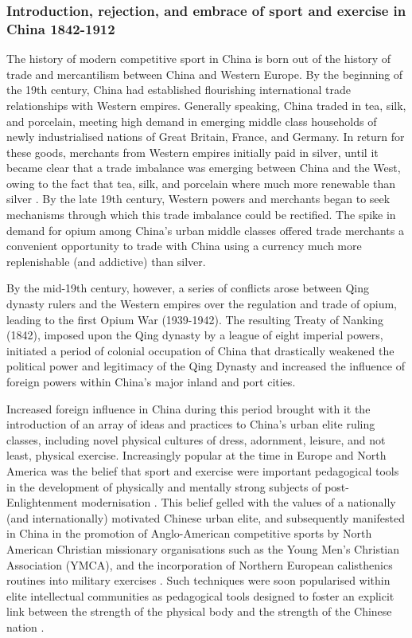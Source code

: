 \begin{CJK}{UTF8}{gbsn}
  \subsubsection{Introduction, rejection, and embrace of sport and exercise in China 1842-1912 \label{sect:introEnMasse}}

The history of modern competitive sport in China is born out of the history of trade and mercantilism between China and Western Europe.
By the beginning of the 19th century, China had established flourishing international trade relationships with Western empires.  Generally speaking, China traded in tea, silk, and porcelain, meeting high demand in emerging middle class households of newly industrialised nations of Great Britain, France, and Germany.  In return for these goods, merchants from Western empires initially paid in silver, until it became clear that a trade imbalance was emerging between China and the West, owing to the fact that tea, silk, and porcelain where much more renewable than silver \citep{Fay2000}.  By the late 19th century, Western powers and merchants began to seek mechanisms through which this trade imbalance could be rectified.  The spike in demand for opium among China's urban middle classes offered trade merchants a convenient opportunity to trade with China using a currency much more replenishable (and addictive) than silver.

By the mid-19th century, however, a series of conflicts arose between Qing dynasty rulers and the Western empires over the regulation and trade of opium, leading to the first Opium War (1939-1942).  The resulting Treaty of Nanking (1842), imposed upon the Qing dynasty by a league of eight imperial powers, initiated a period of colonial occupation of China that drastically weakened the political power and legitimacy of the Qing Dynasty and increased the influence of foreign powers within China's major inland and port cities.

Increased foreign influence in China during this period brought with it the introduction of an array of ideas and practices to China's urban elite ruling classes, including novel physical cultures of dress, adornment, leisure, and not least, physical exercise.  Increasingly popular at the time in Europe and North America was the belief that sport and exercise were important pedagogical tools in the development of physically and mentally strong subjects of post-Enlightenment modernisation \citep{Elias1986}.  This belief gelled with the values of a nationally (and internationally) motivated Chinese urban elite, and subsequently manifested in China in the promotion of Anglo-American competitive sports by North American Christian missionary organisations such as the Young Men’s Christian Association (YMCA), and the incorporation of Northern European calisthenics routines into military exercises \citep[240]{Morris2004}.  Such techniques were soon popularised within elite intellectual communities as pedagogical tools designed to foster an explicit link between the strength of the physical body and the strength of the Chinese nation \cites[32]{Morris2004}[49]{Brownell1995}.


\end{CJK}

